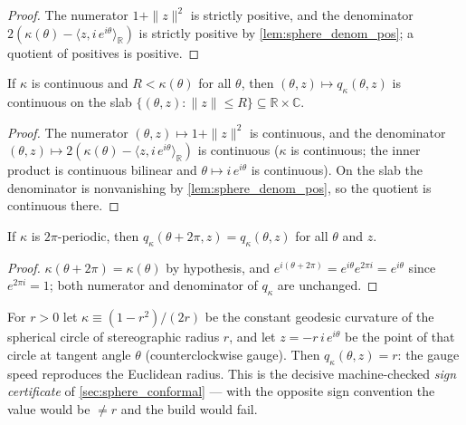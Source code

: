 \begin{proof}

\leanok
  The numerator $1+\|z\|^2$ is strictly positive, and the denominator
  $2(\kappa(\theta)-\langle z, i\,e^{i\theta}\rangle_{\mathbb R})$ is strictly positive by
  \cref{lem:sphere_denom_pos}; a quotient of positives is positive.
\end{proof}

\begin{lemma}
  \label{lem:spherical_speed_continuous}
  If $\kappa$ is continuous and $R<\kappa(\theta)$ for all $\theta$, then
  $(\theta,z)\mapsto q_\kappa(\theta,z)$ is continuous on the slab
  $\{(\theta,z):\|z\|\le R\}\subseteq\mathbb R\times\mathbb C$.
\end{lemma}

\begin{proof}

\leanok
  The numerator $(\theta,z)\mapsto 1+\|z\|^2$ is continuous, and the denominator
  $(\theta,z)\mapsto 2(\kappa(\theta)-\langle z, i\,e^{i\theta}\rangle_{\mathbb R})$ is
  continuous ($\kappa$ is continuous; the inner product is continuous bilinear and
  $\theta\mapsto i\,e^{i\theta}$ is continuous). On the slab the denominator is nonvanishing
  by \cref{lem:sphere_denom_pos}, so the quotient is continuous there.
\end{proof}

\begin{lemma}
  \label{lem:spherical_speed_periodic}
  If $\kappa$ is $2\pi$-periodic, then $q_\kappa(\theta+2\pi,z)=q_\kappa(\theta,z)$ for all
  $\theta$ and $z$.
\end{lemma}

\begin{proof}

\leanok
  $\kappa(\theta+2\pi)=\kappa(\theta)$ by hypothesis, and
  $e^{i(\theta+2\pi)}=e^{i\theta}e^{2\pi i}=e^{i\theta}$ since $e^{2\pi i}=1$; both
  numerator and denominator of $q_\kappa$ are unchanged.
\end{proof}

\begin{lemma}

  \label{lem:spherical_speed_circle}
  For $r>0$ let $\kappa\equiv(1-r^2)/(2r)$ be the constant geodesic curvature of the
  spherical circle of stereographic radius $r$, and let $z=-r\,i\,e^{i\theta}$ be the point
  of that circle at tangent angle $\theta$ (counterclockwise gauge). Then
  $q_\kappa(\theta,z)=r$: the gauge speed reproduces the Euclidean radius. This is the
  decisive machine-checked \emph{sign certificate} of \cref{sec:sphere_conformal} — with
  the opposite sign convention the value would be $\ne r$ and the build would fail.
\end{lemma}


